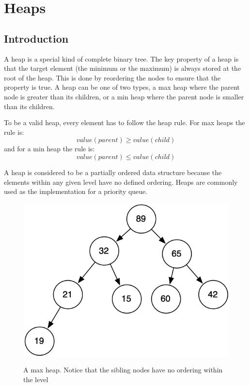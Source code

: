 
 
\chapter{Heaps}
\section{Introduction}
A heap is a special kind of complete binary tree.  The key property of a heap is that  the target element (the minimum or the maximum) is always stored at the root of the heap.   This is done by reordering the nodes to ensure that the property is true.   A heap can be one of two types, a max heap where the parent node is greater than its children, or a min heap where the parent node is smaller than its children.

To be a valid heap, every element has to follow the heap rule. For max heaps the rule is: \begin{equation}value(parent) \geq value(child)\end{equation}   and for a min heap the rule is: \begin{equation}value(parent) \leq value(child)\end{equation}

A heap is considered to be a partially ordered data structure because the elements within any given level have no defined ordering.  Heaps are commonly used as the implementation for a priority queue.

\begin{figure}[H]
\centering
\includegraphics{pictures/maxheap.png}
\label{fig:maxheap}
\caption{A max heap.  Notice that the sibling nodes have no ordering within the level}
\end{figure}


